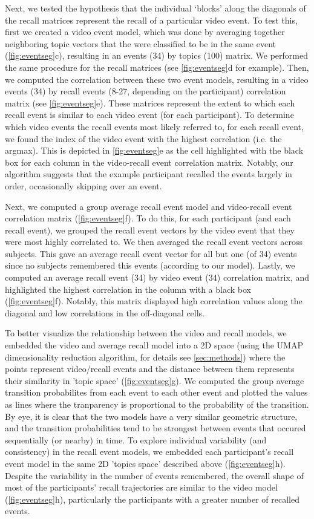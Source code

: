 \documentclass[a4paper,man,natbib,floatsintext]{apa6}
\begin{document}
Next, we tested the hypothesis that the individual `blocks' along the diagonals of the recall matrices represent the recall of a particular video event. To test this, first we created a video event model, which was done by averaging together neighboring topic vectors that the were classified to be in the same event (\ref{fig:eventseg}c), resulting in an events (34) by topics (100) matrix.  We performed the same procedure for the recall matrices (see \ref{fig:eventseg}d for example). Then, we computed the correlation between these two event models, resulting in a video events (34) by recall events (8-27, depending on the participant) correlation matrix (see \ref{fig:eventseg}e). These matrices represent the extent to which each recall event is similar to each video event (for each participant). To determine which video events the recall events most likely referred to, for each recall event, we found the index of the video event with the highest correlation (i.e. the argmax).  This is depicted in \ref{fig:eventseg}e as the cell highlighted with the black box for each column in the video-recall event correlation matrix. Notably, our algorithm suggests that the example participant recalled the events largely in order, occasionally skipping over an event.

Next, we computed a group average recall event model and video-recall event correlation matrix (\ref{fig:eventseg}f).  To do this, for each participant (and each recall event), we grouped the recall event vectors by the video event that they were most highly correlated to. We then averaged the recall event vectors across subjects. This gave an average recall event vector for all but one (of 34) events since no subjects remembered this events (according to our model). Lastly, we computed an average recall event (34) by video event (34) correlation matrix, and highlighted the highest correlation in the column with a black box (\ref{fig:eventseg}f). Notably, this matrix displayed high correlation values along the diagonal and low correlations in the off-diagonal cells.

To better visualize the relationship between the video and recall models, we embedded the video and average recall model into a 2D space (using the UMAP dimensionality reduction algorithm, for details see \ref{sec:methods}) where the points represent video/recall events and the distance between them represents their similarity in 'topic space' (\ref{fig:eventseg}g). We computed the group average transition probabilites from each event to each other event and plotted the values as lines where the tranparency is proportional to the probability of the transition.  By eye, it is clear that the two models have a very similar geometric structure, and the transition probabilities tend to be strongest between events that occured sequentially (or nearby) in time. To explore individual variability (and consistency) in the recall event models, we embedded each participant's recall event model in the same 2D 'topics space' described above (\ref{fig:eventseg}h). Despite the variability in the number of events remembered, the overall shape of most of the participants' recall trajectories are similar to the video model (\ref{fig:eventseg}h), particularly the participants with a greater number of recalled events.
\end{document}
